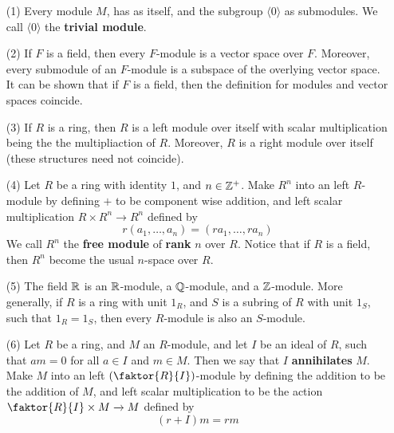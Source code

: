 \begin{example}\label{}
    \begin{enumerate}
        \item[(1)] Every module $M$, has as itself, and the subgroup $\langle 0
            \rangle$ as submodules. We call $\langle 0 \rangle$ the
            \textbf{trivial module}.

        \item[(2)] If $F$ is a field, then every  $F$-module is a vector space
            over $F$. Moreover, every submodule of an  $F$-module is a subspace
            of the overlying vector space. It can be shown that if  $F$ is a
            field, then the definition for modules and vector spaces coincide.

        \item[(3)] If $R$ is a ring, then  $R$ is a left module over itself with
            scalar multiplication being the the multipliaction of $R$. Moreover,
            $R$ is a right module over itself (these structures need not
            coincide).

        \item[(4)] Let $R$ be a ring with identity  $1$, and  $n \in \mathbb{Z}^+$. Make
             $R^n$ into an left $R$-module by defining $+$ to be component wise
             addition, and left scalar multiplication $R \times R^n
             \xrightarrow{} R^n$ defined by
             \begin{equation*}
                 r(a_1, \dots, a_n)=(ra_1, \dots, ra_n)
             \end{equation*}
             We call $R^n$ the  \textbf{free module} of \textbf{rank} $n$ over
             $R$. Notice that if  $R$ is a field, then $R^n$ become the usual
             $n$-space over $R$.

         \item[(5)] The field $\mathbb{R}$ is an  $\mathbb{R}$-module, a  $\mathbb{Q}$-module, and a
             $\mathbb{Z}$-module. More generally, if $R$ is a ring with unit $1_R$, and
             $S$ is a subring of $R$ with unit $1_S$, such that  $1_R=1_S$, then
             every  $R$-module is also an  $S$-module.

         \item[(6)] Let $R$ be a ring, and  $M$ an  $R$-module, and let  $I$ be
             an ideal of  $R$, such that  $am=0$ for all  $a \in I$ and  $m \in
             M$. Then we say that  $I$  \textbf{annihilates} $M$. Make $M$ into
             an left $(\faktor{R}{I})$-module by defining the addition to be the
             addition of $M$, and left scalar multiplication to be the action
             $\faktor{R}{I} \times M \xrightarrow{} M$ defined by
             \begin{equation*}
                 (r+I)m=rm
             \end{equation*}


\end{enumerate}
\end{example}
